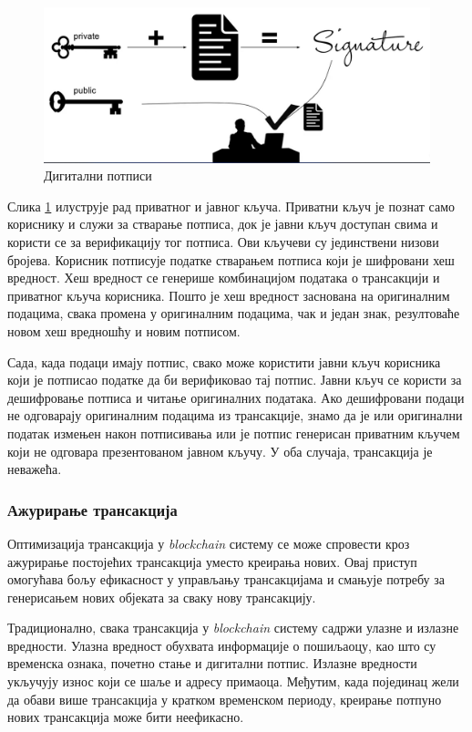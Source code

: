 \documentclass[12pt, a4paper]{article}
\begin{document}
\begin{figure}[h]
    \centering
    \includegraphics[width=1\linewidth]{slike/signature.png}
    \caption{Дигитални потписи}
    \label{fig:digital-signatures}
\end{figure}

Слика \ref{fig:digital-signatures} илуструје рад приватног и јавног кључа. Приватни кључ је познат само кориснику и служи за стварање потписа, док је јавни кључ доступан свима и користи се за верификацију тог потписа. Ови кључеви су јединствени низови бројева. Корисник потписује податке стварањем потписа који је шифровани хеш вредност. Хеш вредност се генерише комбинацијом података о трансакцији и приватног кључа корисника. Пошто је хеш вредност заснована на оригиналним подацима, свака промена у оригиналним подацима, чак и један знак, резултоваће новом хеш вредношћу и новим потписом.

Сада, када подаци имају потпис, свако може користити јавни кључ корисника који је потписао податке да би верификовао тај потпис. Јавни кључ се користи за дешифровање потписа и читање оригиналних података. Ако дешифровани подаци не одговарају оригиналним подацима из трансакције, знамо да је или оригинални податак измењен након потписивања или је потпис генерисан приватним кључем који не одговара презентованом јавном кључу. У оба случаја, трансакција је неважећа.

\subsubsection{Ажурирање трансакција}
Оптимизација трансакција у \textit{blockchain} систему се може спровести кроз ажурирање постојећих трансакција уместо креирања нових. Овај приступ омогућава бољу ефикасност у управљању трансакцијама и смањује потребу за генерисањем нових објеката за сваку нову трансакцију.

Традиционално, свака трансакција у \textit{blockchain} систему садржи улазне и излазне вредности. Улазна вредност обухвата информације о пошиљаоцу, као што су временска ознака, почетно стање и дигитални потпис. Излазне вредности укључују износ који се шаље и адресу примаоца. Међутим, када појединац жели да обави више трансакција у кратком временском периоду, креирање потпуно нових трансакција може бити неефикасно.
\end{document}

